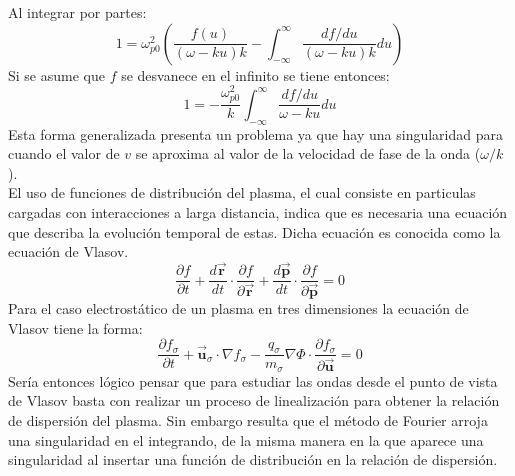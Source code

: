 \documentclass[../tesis_main_file.tex]{subfiles}
\begin{document}
Al integrar por partes:
\begin{equation}
1=\omega^2_{p0}\left(\frac{f(u)}{(\omega - ku)k}- \int^{\infty}_{-\infty}\frac{df/du}{(\omega -k u)k}du \right)
\end{equation}
Si se asume que $f$ se desvanece en el infinito se tiene entonces:
\begin{equation}
1=-\frac{\omega^2_{p0}}{k}\int^{\infty}_{-\infty}\frac{df/du}{\omega -k u}du
\end{equation}
Esta forma generalizada presenta un problema ya que hay una singularidad para cuando el valor de $v$ se aproxima al valor de la velocidad de fase de la onda ($\omega/k$).\\
El uso de funciones de distribución del plasma, el cual consiste en particulas cargadas con interacciones a larga distancia, indica que es necesaria una ecuación que describa la evolución temporal de estas. Dicha ecuación es conocida como la ecuación de Vlasov.\cite{bellan2008fundamentals}\\
\begin{equation}
\label{eq:vlasov_def}
\frac{\partial f}{\partial t} + \frac{d\overrightarrow{\textbf{r}}}{dt}\cdot \frac{\partial f}{\partial \overrightarrow{\textbf{r}}} + \frac{d \overrightarrow{\textbf{p}}}{dt}\cdot \frac{\partial f}{\partial \overrightarrow{\textbf{p}}}=0
\end{equation}
Para el caso electrostático de un plasma en tres dimensiones la ecuación de Vlasov tiene la forma:
\begin{equation}
\label{eq:vlasov-poisson_3D}
\frac{\partial f_{\sigma}}{\partial t} + \overrightarrow{\textbf{u}}_{\sigma} \cdot \nabla f_{\sigma} -\frac{q_{\sigma}}{m_{\sigma}}\nabla \Phi \cdot \frac{\partial f_{\sigma}}{\partial \overrightarrow{\textbf{u}}}=0
\end{equation}
Sería entonces lógico pensar que para estudiar las ondas desde el punto de vista de Vlasov basta con realizar un proceso de linealización para obtener la relación de dispersión del plasma. Sin embargo resulta que el método de Fourier arroja una singularidad en el integrando, de la misma manera en la que aparece una singularidad al insertar una función de distribución en la relación de dispersión.\\
\end{document}
